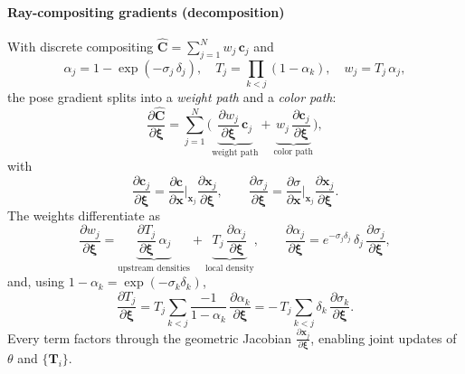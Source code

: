 \begin{enrichment}
\begin{enrichment}
        \paragraph{Ray-compositing gradients (decomposition)}
        With discrete compositing \(\widehat{\mathbf{C}}=\sum_{j=1}^{N} w_j\,\mathbf{c}_j\) and
        \[
        \alpha_j = 1-\exp(-\sigma_j\,\delta_j),\quad
        T_j = \prod_{k<j} (1-\alpha_k),\quad
        w_j = T_j\,\alpha_j,
        \]
        the pose gradient splits into a \emph{weight path} and a \emph{color path}:
        \[
        \frac{\partial \widehat{\mathbf{C}}}{\partial \boldsymbol{\xi}}
        =
        \sum_{j=1}^{N}\!\Big(\underbrace{\frac{\partial w_j}{\partial \boldsymbol{\xi}}\,\mathbf{c}_j}_{\text{weight path}}
        +\underbrace{w_j\,\frac{\partial \mathbf{c}_j}{\partial \boldsymbol{\xi}}}_{\text{color path}}\Big),
        \]
        with
        \[
        \frac{\partial \mathbf{c}_j}{\partial \boldsymbol{\xi}}
        =
        \frac{\partial \mathbf{c}}{\partial \mathbf{x}}\Big|_{\mathbf{x}_j}
        \frac{\partial \mathbf{x}_j}{\partial \boldsymbol{\xi}},
        \qquad
        \frac{\partial \sigma_j}{\partial \boldsymbol{\xi}}
        =
        \frac{\partial \sigma}{\partial \mathbf{x}}\Big|_{\mathbf{x}_j}
        \frac{\partial \mathbf{x}_j}{\partial \boldsymbol{\xi}}.
        \]
        The weights differentiate as
        \[
        \frac{\partial w_j}{\partial \boldsymbol{\xi}}
        =
        \underbrace{\frac{\partial T_j}{\partial \boldsymbol{\xi}}\,\alpha_j}_{\text{upstream densities}}
        +
        \underbrace{T_j\,\frac{\partial \alpha_j}{\partial \boldsymbol{\xi}}}_{\text{local density}},
        \qquad
        \frac{\partial \alpha_j}{\partial \boldsymbol{\xi}}
        =
        e^{-\sigma_j\delta_j}\,\delta_j\,\frac{\partial \sigma_j}{\partial \boldsymbol{\xi}},
        \]
        and, using \(1-\alpha_k=\exp(-\sigma_k\delta_k)\),
        \[
        \frac{\partial T_j}{\partial \boldsymbol{\xi}}
        =
        T_j \sum_{k<j}\frac{-1}{1-\alpha_k}\,\frac{\partial \alpha_k}{\partial \boldsymbol{\xi}}
        =
        -\,T_j \sum_{k<j} \delta_k\,\frac{\partial \sigma_k}{\partial \boldsymbol{\xi}}.
        \]
        Every term factors through the geometric Jacobian \(\tfrac{\partial \mathbf{x}_j}{\partial \boldsymbol{\xi}}\), enabling joint updates of \(\theta\) and \(\{\mathbf{T}_i\}\).
        

\end{enrichment}
\end{enrichment}
